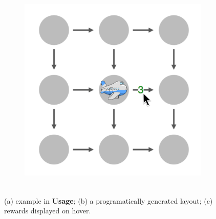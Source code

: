 \documentclass[final]{beamer}
\newlength{\twocolwid}
\begin{document}
\begin{frame}[t, fragile]
\begin{columns}[t]
\begin{column}{\twocolwid}
\begin{figure}
    \begin{subfigure}{.28\textwidth}
      \centering
      \includegraphics[height=10cm]{figs/grid2.png}
      \caption{}
      \label{fig:hover}
    \end{subfigure}
    \caption{(a) example in \textbf{Usage}; (b) a programatically generated layout; (c) rewards displayed on hover.}
    \label{fig:test}
  \end{figure}



\end{column}
\end{columns}
\end{frame}
\end{document}
